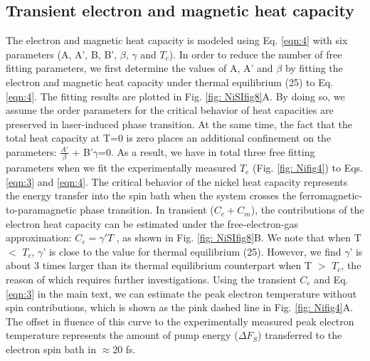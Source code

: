 \subsection{Transient electron and magnetic heat capacity}
The electron and magnetic heat capacity is modeled using Eq. \ref{eqn:4} with six parameters (A, A', B, B', $\beta$, $\gamma$ and $T_c$). In order to reduce the number of free fitting parameters, we first determine the values of A, A' and $\beta$ by fitting the electron and magnetic heat capacity under thermal equilibrium (25) to Eq. \ref{eqn:4}. The fitting results are plotted in Fig. \ref{fig: NiSIfig8}A. By doing so, we assume the order parameters for the critical behavior of heat capacities are preserved in laser-induced phase transition. At the same time, the fact that the total heat capacity at T=0 is zero places an additional confinement on the parameters: $\frac{A'}{\beta}$ + B'$\gamma$=0. As a result, we have in total three free fitting parameters when we fit the experimentally measured $T_e$ (Fig. \ref{fig: Nifig4}) to Eqs. \ref{eqn:3} and \ref{eqn:4}. 
The critical behavior of the nickel heat capacity represents the energy transfer into the spin bath when the system crosses the ferromagnetic-to-paramagnetic phase transition. In transient ($C_e+C_m$), the contributions of the electron heat capacity can be estimated under the free-electron-gas approximation: $C_e=\gamma'T$ , as shown in Fig. \ref{fig: NiSIfig8}B. We note that when T $<$ $T_c$, $\gamma$' is close to the value for thermal equilibrium (25). However, we find $\gamma$' is about 3 times larger than its thermal equilibrium counterpart when T $>$ $T_c$, the reason of which requires further investigations. Using the transient $C_e$ and Eq.\ref{eqn:3} in the main text, we can estimate the peak electron temperature without spin contributions, which is shown as the pink dashed line in Fig. \ref{fig: Nifig4}A. The offset in fluence of this curve to the experimentally measured peak electron temperature represents the amount of pump energy ($\Delta F_S$) transferred to the electron spin bath in $\approx$20 fs.  

